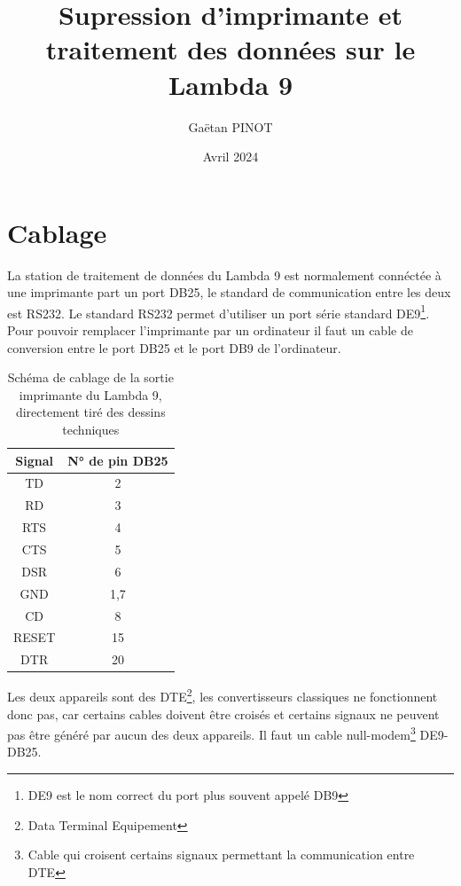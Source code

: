 \documentclass[a4paper, 12pt]{article}
\title{\Large\textbf{Supression d'imprimante et traitement des données sur le Lambda 9}}
\author{Gaëtan PINOT}
\date{Avril 2024}
\begin{document}
\maketitle

\newpage


\section{Cablage}\label{cablage}

La station de traitement de données du Lambda 9 est normalement connéctée à une imprimante part un port DB25, le standard de communication entre les deux est RS232.
Le standard RS232 permet d'utiliser un port série standard DE9\footnote{DE9 est le nom correct du port plus souvent appelé DB9 %
}.
Pour pouvoir remplacer l'imprimante par un ordinateur il faut un cable de conversion entre le port DB25 et le port DB9 de l'ordinateur.


\begin{table}[htb]
	\begin{tabular}{|c|c|}
		\hline
		Signal & N° de pin DB25 \\ \hline
		TD     & 2              \\ \hline
		RD     & 3              \\ \hline
		RTS    & 4              \\ \hline
		CTS    & 5              \\ \hline
		DSR    & 6              \\ \hline
		GND    & 1,7            \\ \hline
		CD     & 8              \\ \hline
		RESET  & 15             \\ \hline
		DTR    & 20             \\ \hline
	\end{tabular}
	\centering
	\caption{Schéma de cablage de la sortie imprimante du Lambda 9, directement tiré des dessins techniques}
	\label{table:pinoutLambda}
\end{table}

Les deux appareils sont des DTE\footnote{Data Terminal Equipement}, les convertisseurs classiques ne fonctionnent donc pas, car certains cables doivent être croisés et certains signaux ne peuvent pas être généré par aucun des deux appareils.
Il faut un cable null-modem\footnote{Cable qui croisent certains signaux permettant la communication entre DTE} DE9-DB25.
\end{document}
